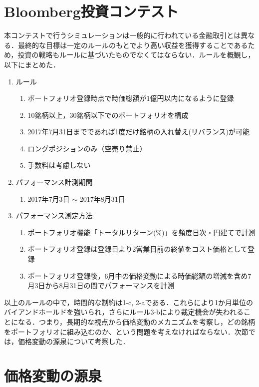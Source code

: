 ﻿\documentclass[11pt]{jreport}
\begin{document}
\section{Bloomberg投資コンテスト}
本コンテストで行うシミュレーションは一般的に行われている金融取引とは異なる．最終的な目標は一定のルールのもとでより高い収益を獲得することであるため，投資の戦略もルールに基づいたものでなくてはならない．ルールを概観し，以下にまとめた．

\begin{enumerate}
\item ルール
\begin{enumerate}
\item ポートフォリオ登録時点で時価総額が1億円以内になるように登録
\item 10銘柄以上，30銘柄以下でのポートフォリオを構成
\item 2017年7月31日までであれば1度だけ銘柄の入れ替え(リバランス)が可能
\item ロングポジションのみ（空売り禁止）
\item 手数料は考慮しない
\end{enumerate}

\item パフォーマンス計測期間
\begin{enumerate}
\item  2017年7月3日 $\sim$ 2017年8月31日
\end{enumerate}

\item パフォーマンス測定方法
\begin{enumerate}
\item ポートフォリオ機能「トータルリターン(\%)」を頻度日次・円建てで計測
\item ポートフォリオ登録は登録日より2営業日前の終値をコスト価格として登録
\item ポートフォリオ登録後，6月中の価格変動による時価総額の増減を含め7月3日から8月31日の間でパフォーマンスを計測
\end{enumerate}
\end{enumerate}

以上のルールの中で，時間的な制約は1-c, 2-aである．これらにより1か月単位のバイアンドホールドを強いられ，さらにルール3-bにより裁定機会が失われることになる．つまり，長期的な視点から価格変動のメカニズムを考察し，どの銘柄をポートフォリオに組み込むのか、という問題を考えなければならない．次節では，価格変動の源泉について考察した．

\section{価格変動の源泉}
\end{document}
